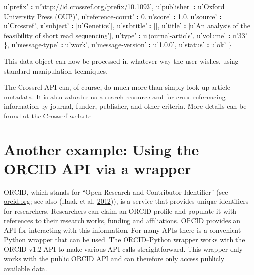 \documentclass[]{krantz}
\newenvironment{Shaded}{\begin{snugshade}}{\end{snugshade}}
\newcommand{\DecValTok}[1]{\textcolor[rgb]{0.00,0.00,0.81}{#1}}
\newcommand{\FloatTok}[1]{\textcolor[rgb]{0.00,0.00,0.81}{#1}}
\newcommand{\StringTok}[1]{\textcolor[rgb]{0.31,0.60,0.02}{#1}}
\newcommand{\OperatorTok}[1]{\textcolor[rgb]{0.81,0.36,0.00}{\textbf{#1}}}
\newcommand{\NormalTok}[1]{#1}
\begin{document}
\begin{Shaded}
\begin{Highlighting}[]
\NormalTok{    u}\StringTok{'prefix'} \OperatorTok{:}\StringTok{ }\NormalTok{u}\StringTok{'http://id.crossref.org/prefix/10.1093'}\NormalTok{,}
\NormalTok{    u}\StringTok{'publisher'} \OperatorTok{:}\StringTok{ }\NormalTok{u}\StringTok{'Oxford University Press (OUP)'}\NormalTok{,}
\NormalTok{    u}\StringTok{'reference-count'} \OperatorTok{:}\StringTok{ }\DecValTok{0}\NormalTok{,}
\NormalTok{    u}\StringTok{'score'} \OperatorTok{:}\StringTok{ }\FloatTok{1.0}\NormalTok{,}
\NormalTok{    u}\StringTok{'source'} \OperatorTok{:}\StringTok{ }\NormalTok{u}\StringTok{'Crossref'}\NormalTok{,}
\NormalTok{    u}\StringTok{'subject'} \OperatorTok{:}\StringTok{ }\NormalTok{[u}\StringTok{'Genetics'}\NormalTok{],}
\NormalTok{    u}\StringTok{'subtitle'} \OperatorTok{:}\StringTok{ }\NormalTok{[],}
\NormalTok{    u}\StringTok{'title'} \OperatorTok{:}\StringTok{ }\NormalTok{[u}\StringTok{'An analysis of the feasibility of short read sequencing'}\NormalTok{],}
\NormalTok{    u}\StringTok{'type'} \OperatorTok{:}\StringTok{ }\NormalTok{u}\StringTok{'journal-article'}\NormalTok{,}
\NormalTok{    u}\StringTok{'volume'} \OperatorTok{:}\StringTok{ }\NormalTok{u}\StringTok{'33'}
\NormalTok{  \},}
\NormalTok{  u}\StringTok{'message-type'} \OperatorTok{:}\StringTok{ }\NormalTok{u}\StringTok{'work'}\NormalTok{,}
\NormalTok{  u}\StringTok{'message-version'} \OperatorTok{:}\StringTok{ }\NormalTok{u}\StringTok{'1.0.0'}\NormalTok{,}
\NormalTok{  u}\StringTok{'status'} \OperatorTok{:}\StringTok{ }\NormalTok{u}\StringTok{'ok'}
\NormalTok{\}}
\end{Highlighting}
\end{Shaded}

This data object can now be processed in whatever way the user wishes,
using standard manipulation techniques.

The Crossref API can, of course, do much more than simply look up
article metadata. It is also valuable as a search resource and for
cross-referencing information by journal, funder, publisher, and other
criteria. More details can be found at the Crossref website.

\section{Another example: Using the ORCID API via a
wrapper}\label{another-example-using-the-orcid-api-via-a-wrapper}

ORCID, which stands for ``Open Research and Contributor Identifier''
(see \url{orcid.org}; see also (Haak et al.
\protect\hyperlink{ref-haak2012orcid}{2012})), is a service that
provides unique identifiers for researchers. Researchers can claim an
ORCID profile and populate it with references to their research works,
funding and affiliations. ORCID provides an API for interacting with
this information. For many APIs there is a convenient Python wrapper
that can be used. The ORCID--Python wrapper works with the ORCID v1.2
API to make various API calls straightforward. This wrapper only works
with the public ORCID API and can therefore only access publicly
available data.
\end{document}
